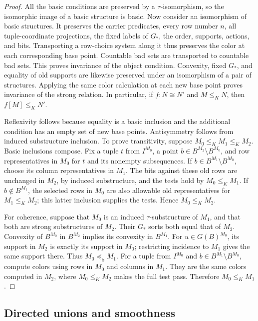 \begin{proof}
All the basic conditions are preserved by a \(\tau\)-isomorphism,
so the isomorphic image of a basic structure is basic.
Now consider an isomorphism of basic structures.  It
preserves the carrier predicates, every row number \(n\), all
tuple-coordinate projections, the fixed labels of \(G_*\),
the order, supports, actions, and bits.  Transporting a
row-choice system along it thus preserves the color at each
corresponding base point.  Countable bad sets are transported
to countable bad sets.  This proves invariance of the object
condition.  Convexity, fixed \(G_*\), and equality of old
supports are likewise preserved under an isomorphism of a
pair of structures.  Applying the same color calculation at
each new base point proves invariance of the strong relation.
In particular, if \(f:N\cong N'\) and \(M\le_K N\), then
\(f[M]\le_K N'\).

Reflexivity follows because equality is a basic inclusion
and the additional condition has an empty set of new base
points.  Antisymmetry follows from induced substructure
inclusion.  To prove transitivity, suppose
\(M_0\le_K M_1\le_K M_2\).  Basic inclusions compose.
Fix a tuple \(t\) from \(I^{M_0}\), a point
\(b\in B^{M_2}\setminus B^{M_0}\), and row representatives
in \(M_0\) for \(t\) and its nonempty subsequences.
If \(b\in B^{M_1}\setminus B^{M_0}\), choose its column
representatives in \(M_1\).  The bits against these old rows
are unchanged in \(M_2\), by induced substructure, and the
tests hold by \(M_0\le_K M_1\).
If \(b\notin B^{M_1}\), the selected rows in \(M_0\) are
also allowable old representatives for \(M_1\le_K M_2\);
this latter inclusion supplies the tests.  Hence
\(M_0\le_K M_2\).

For coherence, suppose that \(M_0\) is an induced
\(\tau\)-substructure of \(M_1\), and that both are strong
substructures of \(M_2\).  Their \(G_*\) sorts both equal
that of \(M_2\).  Convexity of \(B^{M_0}\) in \(B^{M_2}\)
implies its convexity in \(B^{M_1}\).
For \(u\in G(B)^{M_0}\), its support in \(M_2\) is exactly
its support in \(M_0\); restricting incidence to \(M_1\)
gives the same support there.  Thus
\(M_0\preccurlyeq_{\mathrm b}M_1\).
For a tuple from \(I^{M_0}\) and
\(b\in B^{M_1}\setminus B^{M_0}\), compute colors using
rows in \(M_0\) and columns in \(M_1\).  They are the same
colors computed in \(M_2\), where \(M_0\le_K M_2\) makes
the full test pass.  Therefore \(M_0\le_K M_1\).
\end{proof}

\subsection{Directed unions and smoothness}

